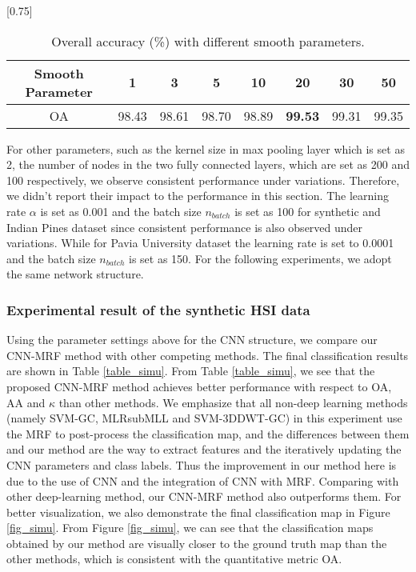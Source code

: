 \documentclass[journal]{IEEEtran}
\begin{document}
		\begin{table}[htp]
			\caption{\label{smoothparameter} {{Overall accuracy (\%) with different smooth parameters.}}}
			\begin{center}
				{\normalsize
					\scalebox{0.75}[0.75]
					{
						\begin{tabular}{|c|c|c|c|c|c|c|c|}
							\hline
							Smooth Parameter& 1    & 3    & 5   & 10  & 20  & 30   & 50 \\
							\hline
							OA      & 98.43  & 98.61  & 98.70 & 98.89 & \bf{99.53} & 99.31 & 99.35\\
							\hline
						\end{tabular}
					}
				}
			\end{center}
		\end{table}
		
		For other parameters, such as the kernel size in max pooling layer which is set as 2, the number of nodes in the two fully connected layers, which are set as 200 and 100 respectively, we {{observe}} consistent performance under variations. Therefore, we {{didn't}} report their impact to the performance in this section. {{The learning rate $\alpha$ is set as 0.001 and the batch size $n_{batch}$ is set as 100 for synthetic and Indian Pines dataset since consistent performance is also observed under variations. While for Pavia University dataset the learning rate is set to 0.0001 and the batch size $n_{batch}$ is set as 150. For the following experiments, we adopt the same network structure.}}
		
		\subsubsection{Experimental result of the synthetic HSI data}
		{{Using the parameter settings above for the CNN structure, we compare our CNN-MRF method with other competing methods. The final classification results are shown in Table \ref{table_simu}}}.  From Table \ref{table_simu}, we see that the proposed CNN-MRF method achieves better performance with respect to OA, AA and $\kappa$ than other methods. We emphasize that all non-deep learning methods {{(namely SVM-GC, MLRsubMLL and SVM-3DDWT-GC)}} in this experiment use the MRF to post-process the classification map, and the differences between them and our method are the way to extract features {{and the iteratively updating the CNN parameters and class labels.}} Thus the improvement in our method here is due to the use of CNN {{and the integration of CNN with MRF. Comparing with other deep-learning method, our CNN-MRF method also outperforms them. For better visualization, we also demonstrate the final classification map in Figure \ref{fig_simu}.}} From Figure \ref{fig_simu}, we can see that the classification 
maps obtained by our method are visually closer to the ground truth map than the other methods, which is consistent with the quantitative metric OA. 
		
\end{document}
